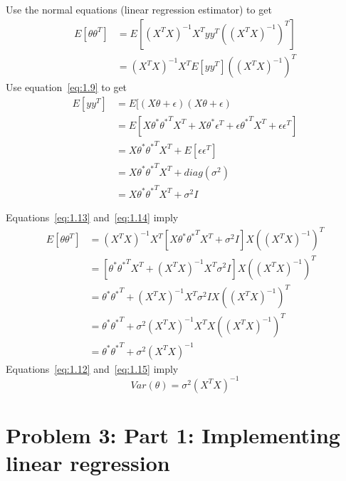\documentclass{article}
\begin{document}
Use the normal equations (linear regression estimator) to get
\begin{equation}
  \label{eq:1.13}
  \begin{split}
    E[\theta\theta^T] &= E\left[ (X^TX)^{-1} X^T yy^T \left( (X^TX)^{-1} \right)^T \right] \\    
    &= (X^TX)^{-1} X^T E[yy^T] \left( (X^TX)^{-1} \right)^T
  \end{split}
\end{equation}
Use equation~\ref{eq:1.9} to get 
\begin{equation}
  \label{eq:1.14}
  \begin{split}
    E[yy^T] &= E[(X\theta + \epsilon) (X\theta + \epsilon) \\
    &= E[X\theta^* {\theta^*}^T X^T + X\theta^*\epsilon^T + \epsilon {\theta^*}^T X^T + \epsilon\epsilon^T] \\
    &= X\theta^* {\theta^*}^T X^T + E[\epsilon\epsilon^T] \\
    &= X\theta^* {\theta^*}^T X^T + diag(\sigma^2) \\
    &= X\theta^* {\theta^*}^T X^T + \sigma^2 I
  \end{split}
\end{equation}

Equations~\ref{eq:1.13} and~\ref{eq:1.14} imply
\begin{equation}
  \label{eq:1.15}
  \begin{split}
    E[\theta\theta^T] &= (X^TX)^{-1} X^T \left[X\theta^* {\theta^*}^T X^T + \sigma^2 I \right] X\left( (X^TX)^{-1} \right)^T \\
    &= \left[\theta^* {\theta^*}^T X^T + (X^TX)^{-1} X^T \sigma^2 I \right] X \left( (X^TX)^{-1} \right)^T \\ 
    &= \theta^* {\theta^*}^T + (X^TX)^{-1} X^T \sigma^2 I X \left( (X^TX)^{-1} \right)^T \\
    &= \theta^* {\theta^*}^T + \sigma^2 (X^TX)^{-1} X^T X \left( (X^TX)^{-1} \right)^T \\
    &= \theta^* {\theta^*}^T + \sigma^2 (X^TX)^{-1}
  \end{split}
\end{equation}
Equations~\ref{eq:1.12} and~\ref{eq:1.15} imply
\begin{equation}
  \label{eq:1.16}
  Var(\theta) = \sigma^2 (X^TX)^{-1}
\end{equation}
\section{Problem 3: Part 1: Implementing  linear regression}
\end{document}
